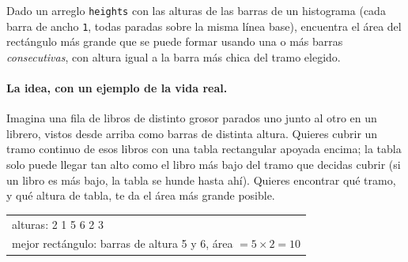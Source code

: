 
Dado un arreglo \texttt{heights} con las alturas de las barras de un
histograma (cada barra de ancho \texttt{1}, todas paradas sobre la misma
línea base), encuentra el área del rectángulo más grande que se puede
formar usando una o más barras \emph{consecutivas}, con altura igual a la
barra más chica del tramo elegido.

\paragraph{La idea, con un ejemplo de la vida real.} Imagina una fila de
libros de distinto grosor parados uno junto al otro en un librero, vistos
desde arriba como barras de distinta altura. Quieres cubrir un tramo
continuo de esos libros con una tabla rectangular apoyada encima; la tabla
solo puede llegar tan alto como el libro más bajo del tramo que decidas
cubrir (si un libro es más bajo, la tabla se hunde hasta ahí). Quieres
encontrar qué tramo, y qué altura de tabla, te da el área más grande
posible.

\begin{center}
\ttfamily
\begin{tabular}{l}
alturas: 2 1 5 6 2 3\\
mejor rectángulo: barras de altura 5 y 6, área $= 5 \times 2 = 10$\\
\end{tabular}
\end{center}

